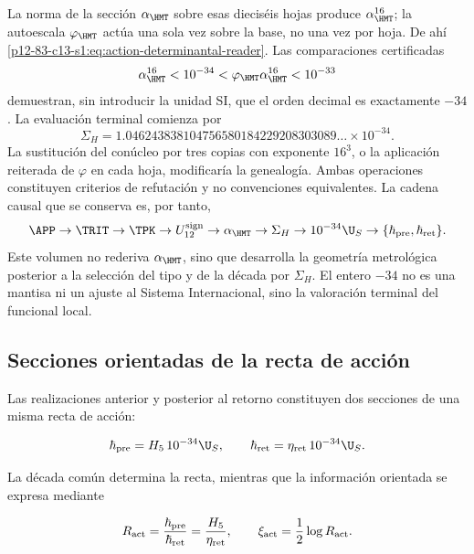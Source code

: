 La norma de la secci\'on \(\alpha_{\HMT}\) sobre esas diecis\'eis hojas
produce \(\alpha_{\HMT}^{16}\); la autoescala \(\varphi_{\HMT}\) act\'ua
una sola vez sobre la base, no una vez por hoja. De ah\'i
\cref{p12-83-c13-s1:eq:action-determinantal-reader}. Las comparaciones certificadas
\begin{equation}
\alpha_{\HMT}^{16}<10^{-34}
<\varphi_{\HMT}\alpha_{\HMT}^{16}<10^{-33}
\label{p12-83-c13-s1:eq:action-decade-bounds}
\end{equation}
demuestran, sin introducir la unidad SI, que el orden decimal es
exactamente \(-34\). La evaluaci\'on terminal comienza por
\begin{equation}
\Sigma_H
=1.046243838104756580184229208303089\ldots\times10^{-34}.
\label{p12-83-c13-s1:eq:action-sigma-value}
\end{equation}
La sustituci\'on del con\'ucleo por tres copias con exponente \(16^3\), o la
aplicaci\'on reiterada de \(\varphi\) en cada hoja, modificar\'ia la
genealog\'ia. Ambas operaciones constituyen criterios de refutaci\'on y no
convenciones equivalentes.
La cadena causal que se conserva es, por tanto,
\[
\APP\to\TRIT\to\TPK\to U_{12}^{\rm sign}
\to\alpha_{\HMT}\to\Sigma_H
\to10^{-34}\U_S\to
\{\hbar_{\rm pre},\hbar_{\rm ret}\}.
\]
Este volumen no rederiva \(\alpha_{\HMT}\), sino que desarrolla la geometr\'ia
metrol\'ogica posterior a la selecci\'on del tipo y de la d\'ecada por
\(\Sigma_H\). El entero \(-34\) no es una mantisa ni un ajuste al Sistema
Internacional, sino la valoraci\'on terminal del funcional local.

\subsection{Secciones orientadas de la recta de acci\'on}

Las realizaciones anterior y posterior al retorno constituyen dos secciones
de una misma recta de acci\'on:

\begin{equation}
\hbar_{\rm pre}=H_5\,10^{-34}\U_S,\qquad
\hbar_{\rm ret}=\eta_{\rm ret}\,10^{-34}\U_S.
\label{p12-83-c13-s1:eq:action-twoway}
\end{equation}

La d\'ecada com\'un determina la recta, mientras que la informaci\'on
orientada se expresa mediante

\begin{equation}
R_{\rm act}=\frac{\hbar_{\rm pre}}{\hbar_{\rm ret}}
=\frac{H_5}{\eta_{\rm ret}},
\qquad
\xi_{\rm act}=\frac12\log R_{\rm act}.
\label{p12-83-c13-s1:eq:action-rapidity}
\end{equation}

